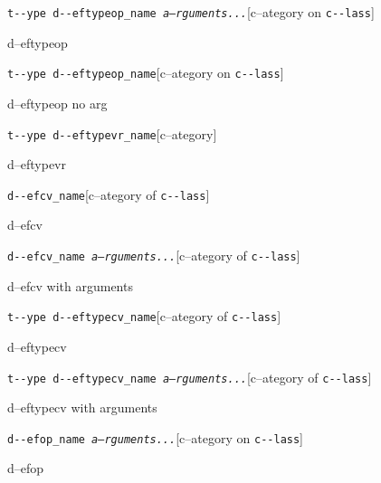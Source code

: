 \documentclass{book}
\begin{document}
\begin{titlepage}
\noindent\texttt{t{-}{-}ype d{-}{-}eftypeop\_name \bgroup{}\normalfont{}\textsl{a--rguments...}\egroup{}}\hfill[c--ategory on \texttt{c{-}{-}lass}]



%
d--eftypeop

\noindent\texttt{t{-}{-}ype d{-}{-}eftypeop\_name}\hfill[c--ategory on \texttt{c{-}{-}lass}]



%
d--eftypeop no arg

\noindent\texttt{t{-}{-}ype d{-}{-}eftypevr\_name}\hfill[c--ategory]



%
d--eftypevr

\noindent\texttt{d{-}{-}efcv\_name}\hfill[c--ategory of \texttt{c{-}{-}lass}]



%
d--efcv

\noindent\texttt{d{-}{-}efcv\_name \bgroup{}\normalfont{}\textsl{a--rguments...}\egroup{}}\hfill[c--ategory of \texttt{c{-}{-}lass}]



%
d--efcv with arguments

\noindent\texttt{t{-}{-}ype d{-}{-}eftypecv\_name}\hfill[c--ategory of \texttt{c{-}{-}lass}]



%
d--eftypecv

\noindent\texttt{t{-}{-}ype d{-}{-}eftypecv\_name \bgroup{}\normalfont{}\textsl{a--rguments...}\egroup{}}\hfill[c--ategory of \texttt{c{-}{-}lass}]



%
d--eftypecv with arguments

\noindent\texttt{d{-}{-}efop\_name \bgroup{}\normalfont{}\textsl{a--rguments...}\egroup{}}\hfill[c--ategory on \texttt{c{-}{-}lass}]



%
d--efop


\end{titlepage}
\end{document}
